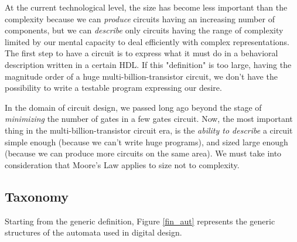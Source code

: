 At the current technological level, the size has become less
important than the complexity because we can {\em produce}
circuits having an increasing number of components, but we can
{\em describe} only circuits having the range of complexity
limited by our mental capacity to deal efficiently with complex
representations. The first step to have a circuit is to express
what it must do in a behavioral description written in a certain
HDL. If this "definition" is too large, having the magnitude order
of a huge multi-billion-transistor circuit, we don't have the
possibility to write a testable program expressing our desire.

In the domain of circuit design, we passed long ago beyond the
stage of {\em minimizing} the number of gates in a few gates
circuit. Now, the most important thing in the
multi-billion-transistor circuit era, is the {\em ability to
describe} a circuit simple enough (because we can't
write huge programs), and sized large enough (because we can produce more circuits on
the same area). We must take into consideration that Moore's Law applies to size not
to complexity.

\subsection{Taxonomy}
Starting from the generic definition, Figure \ref{fin_aut} represents the generic structures of the automata used in digital design.

